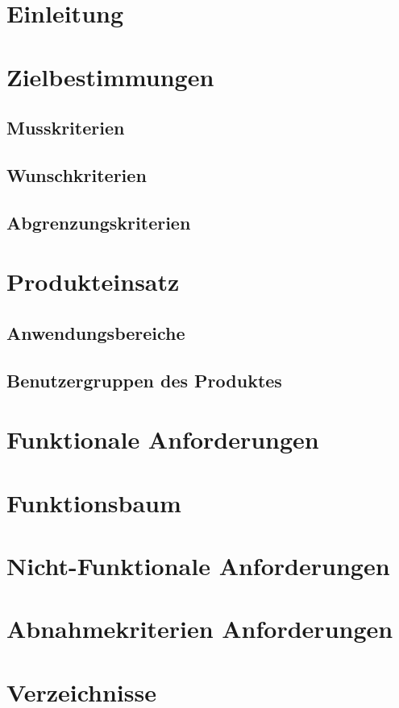 \documentclass[10pt,a4paper,titlepage,twoside,german]{zhawreprt}
\begin{document}
\maketitle

\tableofcontents

\chapter{Einleitung}\label{chp:Introduction}
\chapter{Zielbestimmungen}\label{chp:DefinitionOfGoals}
\section{Musskriterien}\label{sec:MustCriteria}
\section{Wunschkriterien}\label{sec:WishCriteria}
\section{Abgrenzungskriterien}\label{sec:DistinctionCriteria}
\chapter{Produkteinsatz}\label{chp:ProductApplication}
\section{Anwendungsbereiche}\label{sec:FieldOfApplience}
\section{Benutzergruppen des Produktes}\label{sec:TargetAudience}
\chapter{Funktionale Anforderungen}\label{chp:FunctionalRequirements}
\chapter{Funktionsbaum}\label{chp:FunctionTree}
\chapter{Nicht-Funktionale Anforderungen}\label{chp:NonFunctionalRequirements}
\chapter{Abnahmekriterien Anforderungen}\label{chp:TestRequirements}
\chapter{Verzeichnisse}\label{chp:Index}
\printglossary\label{sec:Glossar}
\newpage
\label{sec:Bibliography}
\end{document}
